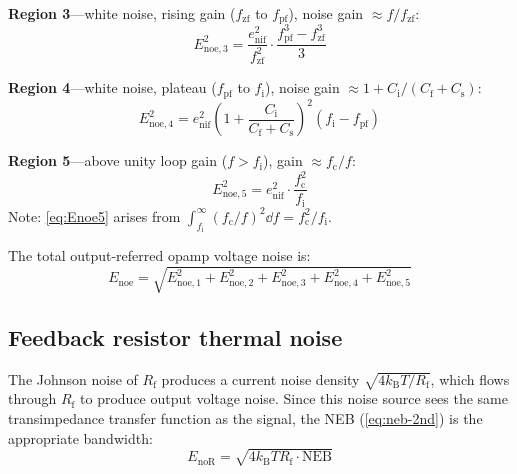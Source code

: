 \documentclass[a4paper,11pt]{article}
\begin{document}
\textbf{Region 3}---white noise, rising gain ($f_{\mathrm{zf}}$ to
$f_{\mathrm{pf}}$), noise gain $\approx f/f_{\mathrm{zf}}$:
\begin{equation}
  E_{\mathrm{noe},3}^2
  = \frac{e_{\mathrm{nif}}^2}{f_{\mathrm{zf}}^2} \cdot
    \frac{f_{\mathrm{pf}}^3 - f_{\mathrm{zf}}^3}{3}
  \label{eq:Enoe3}
\end{equation}

\textbf{Region 4}---white noise, plateau ($f_{\mathrm{pf}}$ to
$f_{\mathrm{i}}$), noise gain
$\approx 1 + C_{\mathrm{i}}/(C_{\mathrm{f}} + C_{\mathrm{s}})$:
\begin{equation}
  E_{\mathrm{noe},4}^2
  = e_{\mathrm{nif}}^2
    \left(1 + \frac{C_{\mathrm{i}}}
                   {C_{\mathrm{f}} + C_{\mathrm{s}}}\right)^{\!2}
    (f_{\mathrm{i}} - f_{\mathrm{pf}})
  \label{eq:Enoe4}
\end{equation}

\textbf{Region 5}---above unity loop gain ($f > f_{\mathrm{i}}$), gain
$\approx f_{\mathrm{c}} / f$:
\begin{equation}
  E_{\mathrm{noe},5}^2
  = e_{\mathrm{nif}}^2 \cdot \frac{f_{\mathrm{c}}^2}{f_{\mathrm{i}}}
  \label{eq:Enoe5}
\end{equation}
Note: \eqref{eq:Enoe5} arises from
$\int_{f_{\mathrm{i}}}^{\infty} (f_{\mathrm{c}}/f)^2 \dd{f}
= f_{\mathrm{c}}^2 / f_{\mathrm{i}}$.

The total output-referred opamp voltage noise is:
\begin{equation}
  E_{\mathrm{noe}}
  = \sqrt{E_{\mathrm{noe},1}^2 + E_{\mathrm{noe},2}^2
          + E_{\mathrm{noe},3}^2 + E_{\mathrm{noe},4}^2
          + E_{\mathrm{noe},5}^2}
  \label{eq:Enoe-total}
\end{equation}

\subsection{Feedback resistor thermal noise}

The Johnson noise of $R_{\mathrm{f}}$ produces a current noise density
$\sqrt{4k_{\mathrm{B}}T/R_{\mathrm{f}}}$, which flows through
$R_{\mathrm{f}}$ to produce output voltage noise.  Since this noise
source sees the same transimpedance transfer function as the signal, the
NEB (\eqref{eq:neb-2nd}) is the appropriate bandwidth:
\begin{equation}
  E_{\mathrm{noR}}
  = \sqrt{4 k_{\mathrm{B}} T R_{\mathrm{f}} \cdot \mathrm{NEB}}
  \label{eq:EnoR}
\end{equation}
\end{document}
